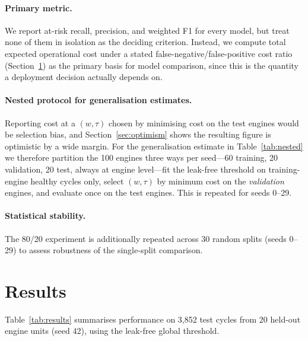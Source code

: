 \documentclass[10pt,twocolumn]{article}
\begin{document}
\paragraph{Primary metric.}
We report at-risk recall, precision, and weighted F1 for every model, but treat none
of them in isolation as the deciding criterion. Instead, we compute total expected
operational cost under a stated false-negative/false-positive cost ratio
(Section~\ref{sec:results}) as the primary basis for model comparison, since this is
the quantity a deployment decision actually depends on.

\paragraph{Nested protocol for generalisation estimates.}
Reporting cost at a $(w,\tau)$
chosen by minimising cost on the test engines would be selection bias, and
Section~\ref{sec:optimism} shows the resulting figure is optimistic by a wide margin.
For the generalisation estimate in Table~\ref{tab:nested} we therefore partition the
100 engines three ways per seed---60 training, 20 validation, 20 test, always at engine
level---fit the leak-free threshold on training-engine healthy cycles only, select
$(w,\tau)$ by minimum cost on the \emph{validation} engines, and evaluate once on the
test engines. This is repeated for seeds 0--29.

\paragraph{Statistical stability.}
The 80/20 experiment is additionally repeated across 30 random splits (seeds 0--29) to
assess robustness of the single-split comparison.

\section{Results}
\label{sec:results}

Table~\ref{tab:results} summarises performance on 3,852 test cycles from 20 held-out
engine units (seed 42), using the leak-free global threshold.
\end{document}
